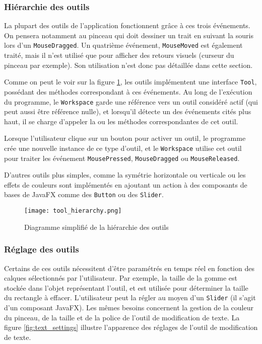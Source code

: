 \subsubsection{Hiérarchie des outils}
\label{section_outils}
La plupart des outils de l'application fonctionnent grâce à ces trois événements. On pensera notamment au pinceau qui doit dessiner un trait en suivant la souris lors d'un \texttt{MouseDragged}. Un quatrième événement, \texttt{MouseMoved} est également traité, mais il n'est utilisé que pour afficher des retours visuels (curseur du pinceau par exemple). Son utilisation n'est donc pas détaillée dans cette section.
\par
Comme on peut le voir sur la figure \ref{fig:tool_hier}, les outils implémentent une interface \texttt{Tool}, possédant des méthodes correspondant à ces événements. Au long de l'exécution du programme, le \texttt{Workspace} garde une référence vers un outil considéré actif (qui peut aussi être référence nulle), et lorsqu'il détecte un des événements cités plus haut, il se charge d'appeler la ou les méthodes correspondantes de cet outil.
\par
Lorsque l'utilisateur clique sur un bouton pour activer un outil, le programme crée une nouvelle instance de ce type d'outil, et le \texttt{Workspace} utilise cet outil pour traiter les événement \texttt{MousePressed}, \texttt{MouseDragged} ou \texttt{MouseReleased}.
\par
D'autres outils plus simples, comme la symétrie horizontale ou verticale ou les effets de couleurs sont implémentés en ajoutant un action à des composants de bases de JavaFX comme des \texttt{Button} ou des \texttt{Slider}.

\begin{figure}[!ht]
	\caption{Diagramme simplifié de la hiérarchie des outils}
	\centering
	\texttt{[image: tool\_hierarchy.png]}
	\label{fig:tool_hier}
\end{figure}
\newpage

\subsubsection{Réglage des outils} \label{reglage-outils}
Certains de ces outils nécessitent d'être paramétrés en temps réel en fonction des calques sélectionnés par l'utilisateur. Par exemple, la taille de la gomme est stockée dans l'objet représentant l'outil, et est utilisée pour déterminer la taille du rectangle à effacer. L'utilisateur peut la régler au moyen d'un \texttt{Slider} (il s'agit d'un composant JavaFX). Les mêmes besoins concernent la gestion de la couleur du pinceau, de la taille et de la police de l'outil de modification de texte. La figure \ref{fig:text_settings} illustre l'apparence des réglages de l'outil de modification de texte.


